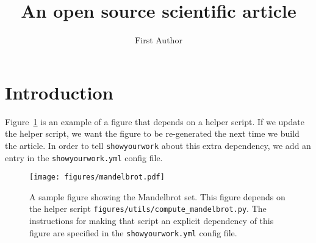\documentclass[twocolumn]{aastex631}
\begin{document}
\title{An open source scientific article}

\author{First Author}

\begin{abstract}
    \blindtext
\end{abstract}

\section{Introduction}

Figure~\ref{fig:mandelbrot} is an example of a figure that depends on a helper script. 
If we update the helper script, we want the figure to be re-generated the next time we build the article.
In order to tell \texttt{showyourwork} about this extra dependency, we add an entry in the \texttt{showyourwork.yml} config file.

\begin{figure}[ht!]
    \begin{centering}
        \texttt{[image: figures/mandelbrot.pdf]}
        \caption{
            A sample figure showing the Mandelbrot set.
            This figure depends on the helper script \texttt{figures/utils/compute\_mandelbrot.py}.
            The instructions for making that script an explicit dependency of this figure are specified in the \texttt{showyourwork.yml} config file.
        }
        \label{fig:mandelbrot}
    \end{centering}
\end{figure}
\end{document}
